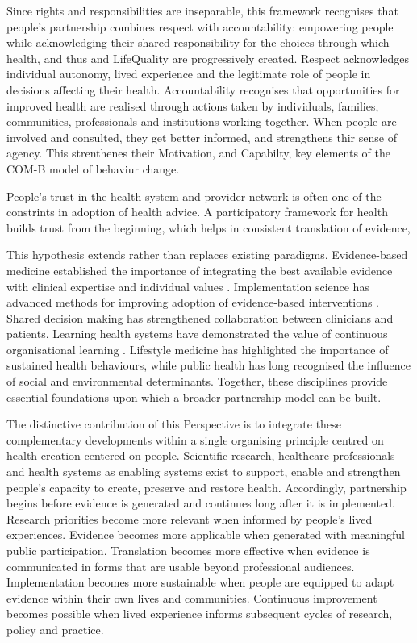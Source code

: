 \documentclass{article}
\begin{document}
Since rights and responsibilities are inseparable, this framework recognises that people's partnership combines respect with accountability: empowering people while acknowledging their shared responsibility for the choices through which health, and thus and LifeQuality are progressively created. Respect acknowledges individual autonomy, lived experience and the legitimate role of people in decisions affecting their health. Accountability recognises that opportunities for improved health are realised through actions taken by individuals, families, communities, professionals and institutions working together. When people are involved and consulted, they get better informed, and strengthens thir sense of agency. This strenthenes their Motivation, and Capabilty,  key elements of the COM-B model of behaviur change.

People's trust in the health system and provider network is often one of the constrints in adoption of health advice. A participatory framework for health builds trust from the beginning, which helps in consistent translation of evidence, 

This hypothesis extends rather than replaces existing paradigms. Evidence-based medicine established the importance of integrating the best available evidence with clinical expertise and individual values \cite{Sackett1996} \cite{Guyatt2015} . Implementation science has advanced methods for improving adoption of evidence-based interventions \cite{Eccles2006} \cite{Nilsen2015} \cite{StrausTetroeGraham2013}. Shared decision making \cite{Elwyn2012} has strengthened collaboration between clinicians and patients. Learning health systems have demonstrated the value of continuous organisational learning \cite{IOM2013} . Lifestyle medicine has highlighted the importance of sustained health behaviours, while public health has long recognised the influence of social and environmental determinants. Together, these disciplines provide essential foundations upon which a broader partnership model can be built.

The distinctive contribution of this Perspective is to integrate these complementary developments within a single organising principle centred on health creation centered on people. Scientific research, healthcare professionals and health systems as enabling systems exist to support, enable and strengthen people's capacity to create, preserve and restore health. Accordingly, partnership begins before evidence is generated and continues long after it is implemented. Research priorities become more relevant when informed by people's lived experiences. Evidence becomes more applicable when generated with meaningful public participation. Translation becomes more effective when evidence is communicated in forms that are usable beyond professional audiences. Implementation becomes more sustainable when people are equipped to adapt evidence within their own lives and communities. Continuous improvement becomes possible when lived experience informs subsequent cycles of research, policy and practice.
\end{document}
